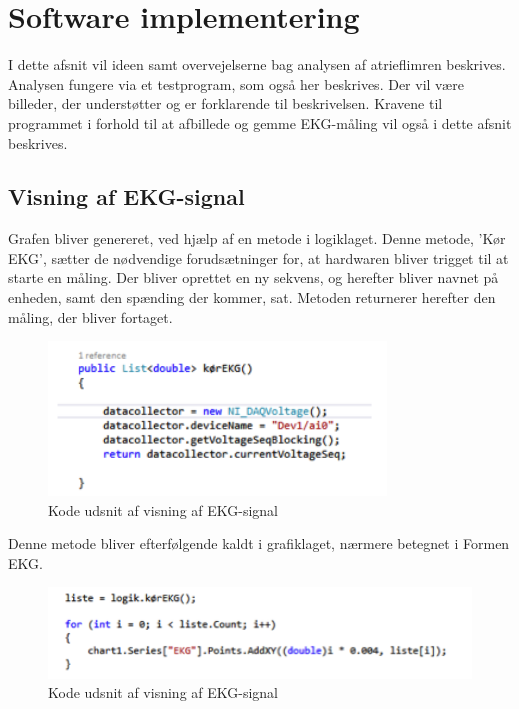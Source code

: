 \section{Software implementering}
I dette afsnit vil ideen samt overvejelserne bag analysen af atrieflimren beskrives. Analysen fungere via et testprogram, som også her beskrives. Der vil være billeder, der understøtter og er forklarende til beskrivelsen. Kravene til programmet i forhold til at afbillede og gemme EKG-måling vil også i dette afsnit beskrives. 

\subsection{Visning af EKG-signal}
Grafen bliver genereret, ved hjælp af en metode i logiklaget. Denne metode, ’Kør EKG’, sætter de nødvendige forudsætninger for, at hardwaren bliver trigget til at starte en måling. Der bliver oprettet en ny sekvens, og herefter bliver navnet på enheden, samt den spænding der kommer, sat. Metoden returnerer herefter den måling, der bliver fortaget.

\begin{figure}[H]
	\centering
	\includegraphics[width=0.8\textwidth]{Figurer/Snip20150525_39}
	\caption{Kode udsnit af visning af EKG-signal}
\end{figure}

Denne metode bliver efterfølgende kaldt i grafiklaget, nærmere betegnet i Formen EKG. 

\begin{figure}[H]
	\centering
	\includegraphics[width=1\textwidth]{Figurer/Snip20150525_40}
	\caption{Kode udsnit af visning af EKG-signal}
\end{figure}

